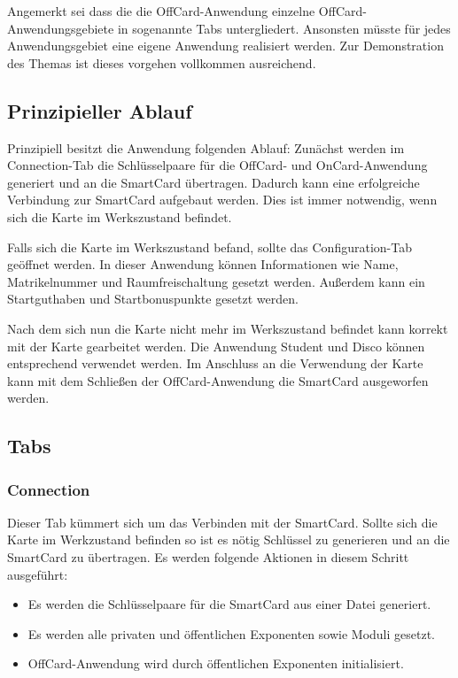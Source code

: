 Angemerkt sei dass die die OffCard-Anwendung einzelne OffCard-Anwendungsgebiete in sogenannte Tabs untergliedert.
Ansonsten müsste für jedes Anwendungsgebiet eine eigene Anwendung realisiert werden.
Zur Demonstration des Themas ist dieses vorgehen vollkommen ausreichend.

\subsection{Prinzipieller Ablauf}
Prinzipiell besitzt die Anwendung folgenden Ablauf:
Zunächst werden im Connection-Tab die Schlüsselpaare für die OffCard- und OnCard-Anwendung generiert und an die SmartCard übertragen.
Dadurch kann eine erfolgreiche Verbindung zur SmartCard aufgebaut werden.
Dies ist immer notwendig, wenn sich die Karte im Werkszustand befindet.

Falls sich die Karte im Werkszustand befand, sollte das Configuration-Tab geöffnet werden.
In dieser Anwendung können Informationen wie Name, Matrikelnummer und Raumfreischaltung gesetzt werden.
Außerdem kann ein Startguthaben und Startbonuspunkte gesetzt werden.

Nach dem sich nun die Karte nicht mehr im Werkszustand befindet kann korrekt mit der Karte gearbeitet werden.
Die Anwendung Student und Disco können entsprechend verwendet werden. 
Im Anschluss an die Verwendung der Karte kann mit dem Schließen der OffCard-Anwendung die SmartCard ausgeworfen werden.

\subsection{Tabs}
\subsubsection{Connection}
Dieser Tab kümmert sich um das Verbinden mit der SmartCard.
Sollte sich die Karte im Werkzustand befinden so ist es nötig Schlüssel zu generieren und an die SmartCard zu übertragen.
Es werden folgende Aktionen in diesem Schritt ausgeführt:
\begin{itemize}
\item Es werden die Schlüsselpaare für die SmartCard aus einer Datei generiert.
\item Es werden alle privaten und öffentlichen Exponenten sowie Moduli gesetzt.
\item OffCard-Anwendung wird durch öffentlichen Exponenten initialisiert.
\end{itemize}

